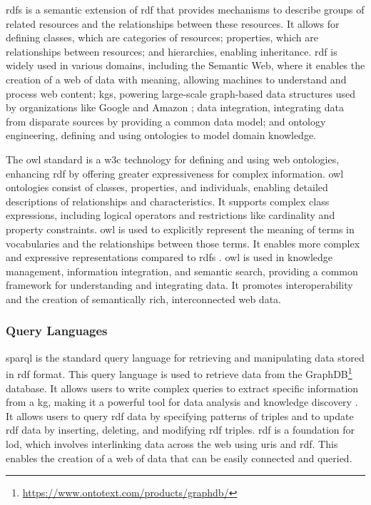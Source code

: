 \gls{rdfs} is a semantic extension of \gls{rdf} that provides mechanisms to describe groups of related resources and the relationships between these resources. It allows for defining classes, which are categories of resources; properties, which are relationships between resources; and hierarchies, enabling inheritance.
\gls{rdf} is widely used in various domains, including the Semantic Web, where it enables the creation of a web of data with meaning, allowing machines to understand and process web content; \glspl{kg}, powering large-scale graph-based data structures used by organizations like Google and Amazon \cite{Kejriwal2022}; data integration, integrating data from disparate sources by providing a common data model; and ontology engineering, defining and using ontologies to model domain knowledge.

The \gls{owl} standard is a \gls{w3c} technology for defining and using web ontologies, enhancing \gls{rdf} by offering greater expressiveness for complex information. \gls{owl} ontologies consist of classes, properties, and individuals, enabling detailed descriptions of relationships and characteristics. It supports complex class expressions, including logical operators and restrictions like cardinality and property constraints.
\gls{owl} is used to explicitly represent the meaning of terms in vocabularies and the relationships between those terms. It enables more complex and expressive representations compared to \gls{rdfs} \cite{Deborah2004}.
\gls{owl} is used in knowledge management, information integration, and semantic search, providing a common framework for understanding and integrating data. It promotes interoperability and the creation of semantically rich, interconnected web data.

\subsubsection*{Query Languages}
\gls{sparql} is the standard query language for retrieving and manipulating data stored in \gls{rdf} format.
This query language is used to retrieve data from the GraphDB\footnote{\url{https://www.ontotext.com/products/graphdb/}} database.
It allows users to write complex queries to extract specific information from a \gls{kg}, making it a powerful tool for data analysis and knowledge discovery \cite{Jorge2009}.
It allows users to query \gls{rdf} data by specifying patterns of triples and to update \gls{rdf} data by inserting, deleting, and modifying \gls{rdf} triples.
\gls{rdf} is a foundation for \gls{lod}, which involves interlinking data across the web using \glspl{uri} and \gls{rdf}. This enables the creation of a web of data that can be easily connected and queried.

